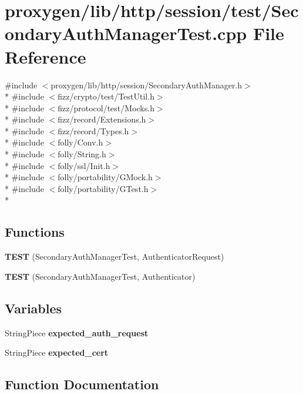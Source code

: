 \section{proxygen/lib/http/session/test/\+Secondary\+Auth\+Manager\+Test.cpp File Reference}
\label{SecondaryAuthManagerTest_8cpp}
{\ttfamily \#include $<$proxygen/lib/http/session/\+Secondary\+Auth\+Manager.\+h$>$}\\*
{\ttfamily \#include $<$fizz/crypto/test/\+Test\+Util.\+h$>$}\\*
{\ttfamily \#include $<$fizz/protocol/test/\+Mocks.\+h$>$}\\*
{\ttfamily \#include $<$fizz/record/\+Extensions.\+h$>$}\\*
{\ttfamily \#include $<$fizz/record/\+Types.\+h$>$}\\*
{\ttfamily \#include $<$folly/\+Conv.\+h$>$}\\*
{\ttfamily \#include $<$folly/\+String.\+h$>$}\\*
{\ttfamily \#include $<$folly/ssl/\+Init.\+h$>$}\\*
{\ttfamily \#include $<$folly/portability/\+G\+Mock.\+h$>$}\\*
{\ttfamily \#include $<$folly/portability/\+G\+Test.\+h$>$}\\*
\subsection*{Functions}
\begin{DoxyCompactItemize}
\item 
{\bf T\+E\+ST} (Secondary\+Auth\+Manager\+Test, Authenticator\+Request)
\item 
{\bf T\+E\+ST} (Secondary\+Auth\+Manager\+Test, Authenticator)
\end{DoxyCompactItemize}
\subsection*{Variables}
\begin{DoxyCompactItemize}
\item 
String\+Piece {\bf expected\+\_\+auth\+\_\+request}
\item 
String\+Piece {\bf expected\+\_\+cert}
\end{DoxyCompactItemize}


\subsection{Function Documentation}
